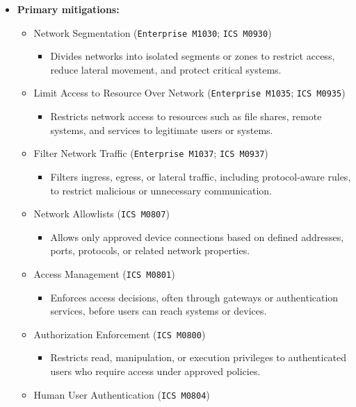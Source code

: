 \documentclass[10pt,a4paper,oneside]{report}
\begin{document}
\begin{itemize}
\item \textbf{Primary mitigations:}
\begin{itemize}
\item Network Segmentation (\texttt{Enterprise M1030}; \texttt{ICS M0930})
\begin{itemize}
\item Divides networks into isolated segments or zones to restrict access, reduce lateral movement, and protect critical systems.
\end{itemize}
\item Limit Access to Resource Over Network (\texttt{Enterprise M1035}; \texttt{ICS M0935})
\begin{itemize}
\item Restricts network access to resources such as file shares, remote systems, and services to legitimate users or systems.
\end{itemize}
\item Filter Network Traffic (\texttt{Enterprise M1037}; \texttt{ICS M0937})
\begin{itemize}
\item Filters ingress, egress, or lateral traffic, including protocol-aware rules, to restrict malicious or unnecessary communication.
\end{itemize}
\item Network Allowlists (\texttt{ICS M0807})
\begin{itemize}
\item Allows only approved device connections based on defined addresses, ports, protocols, or related network properties.
\end{itemize}
\item Access Management (\texttt{ICS M0801})
\begin{itemize}
\item Enforces access decisions, often through gateways or authentication services, before users can reach systems or devices.
\end{itemize}
\item Authorization Enforcement (\texttt{ICS M0800})
\begin{itemize}
\item Restricts read, manipulation, or execution privileges to authenticated users who require access under approved policies.
\end{itemize}
\item Human User Authentication (\texttt{ICS M0804})
\begin{itemize}

\end{itemize}
\end{itemize}
\end{itemize}
\end{document}
